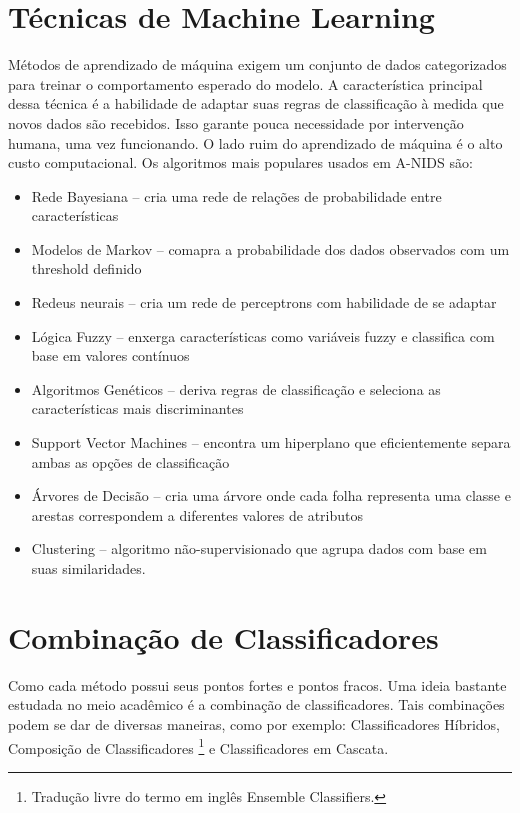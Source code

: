  \section{Técnicas de Machine Learning}
 Métodos de aprendizado de máquina exigem um conjunto de dados categorizados para treinar o comportamento esperado do
 modelo. A característica principal dessa técnica é a habilidade de adaptar suas regras de classificação à medida que
 novos dados são recebidos. Isso garante pouca necessidade por intervenção humana, uma vez funcionando. O lado ruim
 do aprendizado de máquina é o alto custo computacional. Os algoritmos mais populares usados em A-NIDS são:
 \begin{itemize}
    \item Rede Bayesiana -- cria uma rede de relações de probabilidade entre características
    \item Modelos de Markov -- comapra a probabilidade dos dados observados com um threshold definido
    \item Redeus neurais -- cria um rede de perceptrons com habilidade de se adaptar
    \item Lógica Fuzzy -- enxerga características como variáveis fuzzy e classifica com base em valores contínuos
    \item Algoritmos Genéticos -- deriva regras de classificação e seleciona as características mais discriminantes
    \item Support Vector Machines -- encontra um hiperplano que eficientemente separa ambas as opções de classificação
    \item Árvores de Decisão -- cria uma árvore onde cada folha representa uma classe e arestas correspondem a
        diferentes valores de atributos
    \item Clustering -- algoritmo não-supervisionado que agrupa dados com base em suas similaridades.
\end{itemize}

\section{Combinação de Classificadores}
Como cada método possui seus pontos fortes e pontos fracos. Uma ideia bastante estudada no meio acadêmico é a
 combinação de classificadores. Tais combinações podem se dar de diversas maneiras, como por exemplo: Classificadores
 Híbridos, Composição de Classificadores \footnote{Tradução livre do termo em inglês Ensemble Classifiers.} e Classificadores em Cascata.

